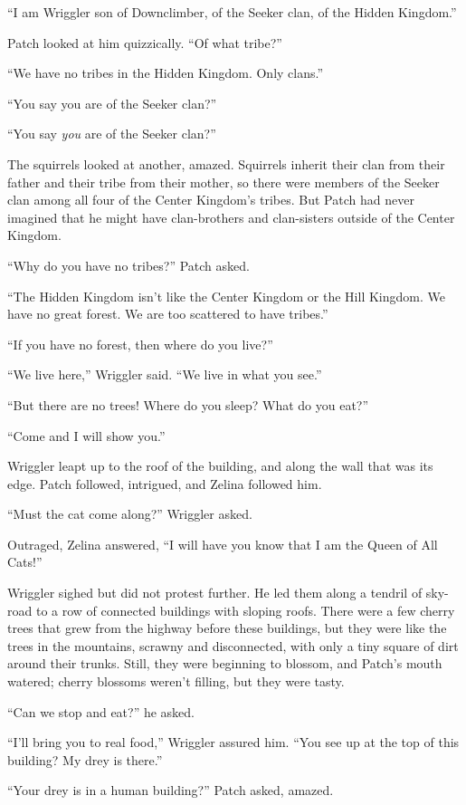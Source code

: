 \documentclass[ebook,oneside,openany,17pt]{memoir}
\begin{document}
“I am Wriggler son of Downclimber, of the Seeker clan, of the Hidden
Kingdom.”

Patch looked at him quizzically. “Of what tribe?”

“We have no tribes in the Hidden Kingdom. Only clans.”

“You say you are of the Seeker clan?”

“You say \emph{you} are of the Seeker clan?”

The squirrels looked at another, amazed. Squirrels inherit their clan
from their father and their tribe from their mother, so there were
members of the Seeker clan among all four of the Center Kingdom’s
tribes. But Patch had never imagined that he might have clan-brothers
and clan-sisters outside of the Center Kingdom.

“Why do you have no tribes?” Patch asked.

“The Hidden Kingdom isn’t like the Center Kingdom or the Hill
Kingdom. We have no great forest. We are too scattered to have
tribes.”

“If you have no forest, then where do you live?”

“We live here,” Wriggler said. “We live in what you see.”

“But there are no trees! Where do you sleep? What do you eat?”

“Come and I will show you.”

Wriggler leapt up to the roof of the building, and along the wall that
was its edge. Patch followed, intrigued, and Zelina followed him.

“Must the cat come along?” Wriggler asked.

Outraged, Zelina answered, “I will have you know that I am the Queen
of All Cats!”

Wriggler sighed but did not protest further. He led them along a
tendril of sky-road to a row of connected buildings with sloping
roofs. There were a few cherry trees that grew from the highway before
these buildings, but they were like the trees in the mountains,
scrawny and disconnected, with only a tiny square of dirt around their
trunks. Still, they were beginning to blossom, and Patch’s mouth
watered; cherry blossoms weren’t filling, but they were tasty.

“Can we stop and eat?” he asked.

“I’ll bring you to real food,” Wriggler assured him. “You see up at
the top of this building? My drey is there.”

“Your drey is in a human building?” Patch asked, amazed.
\end{document}
